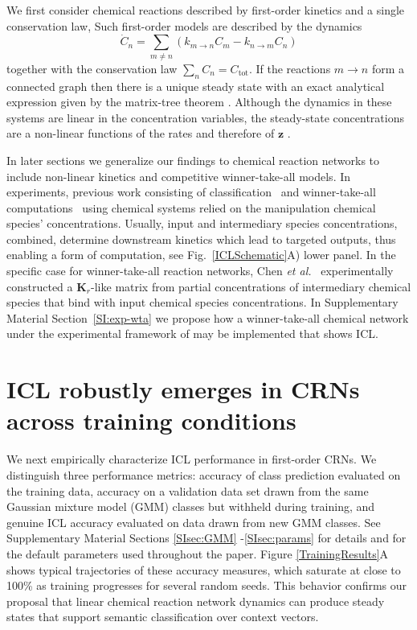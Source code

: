 \documentclass[%
reprint,
superscriptaddress,
amsmath,amssymb,
aps,
]{revtex4-2}
\begin{document}
	We first consider chemical reactions described by first-order kinetics and a single conservation law, 
	Such first-order models are described by the dynamics
	\begin{equation}
		\dot{C}_n = \sum_{m\neq n}\left(k_{m\rightarrow n} C_m - k_{n\rightarrow m} C_n\right) \label{eqlindyn}
	\end{equation}
	together with the conservation law $\sum_n C_n = C_\text{tot}$.  If the reactions $m\rightarrow n$ form a connected graph then there is a unique steady state with an exact analytical expression given by the matrix-tree theorem \cite{schnakenberg1976network, owen2020universal}.   Although the dynamics in these systems are linear in the concentration variables, the steady-state concentrations are a non-linear functions of the rates and therefore of $\mathbf{z}$ \cite{floyd2025limits}.  
	
	In later sections we generalize our findings to chemical reaction networks to include non-linear kinetics and competitive winner-take-all models. In experiments, previous work consisting of classification~\cite{qian2011neural,cherry2025supervised} and winner-take-all computations~\cite{chen2024synthetic,cherry2018scaling} using chemical systems relied on the manipulation chemical species' concentrations. Usually, input and intermediary species concentrations, combined, determine downstream kinetics which lead to targeted outputs, thus enabling a form of computation, see Fig.~\ref{ICLSchematic}A) lower panel. In the specific case for winner-take-all reaction networks, Chen {\it et al.}~\cite{chen2024synthetic} experimentally constructed a $\mathbf{K}_r$-like matrix from partial concentrations of intermediary chemical species that bind with input chemical species concentrations. In Supplementary Material Section~\ref{SI:exp-wta} we propose how a winner-take-all chemical network under the experimental framework of \cite{chen2024synthetic} may be implemented that shows ICL.
	
	\section{ICL robustly emerges in CRNs across training conditions}
	We next empirically characterize ICL performance in first-order CRNs.  We distinguish three performance metrics: accuracy of class prediction evaluated on the training data, accuracy on a validation data set drawn from the same Gaussian mixture model (GMM) classes but withheld during training, and genuine ICL accuracy evaluated on data drawn from new GMM classes. See Supplementary Material Sections \ref{SIsec:GMM} -\ref{SIsec:params} for details and for the default parameters used throughout the paper. Figure \ref{TrainingResults}A shows typical trajectories of these accuracy measures, which saturate at close to 100\% as training progresses for several random seeds. This behavior confirms our proposal that linear chemical reaction network dynamics can produce steady states that support semantic classification over context vectors.
	
\end{document}
